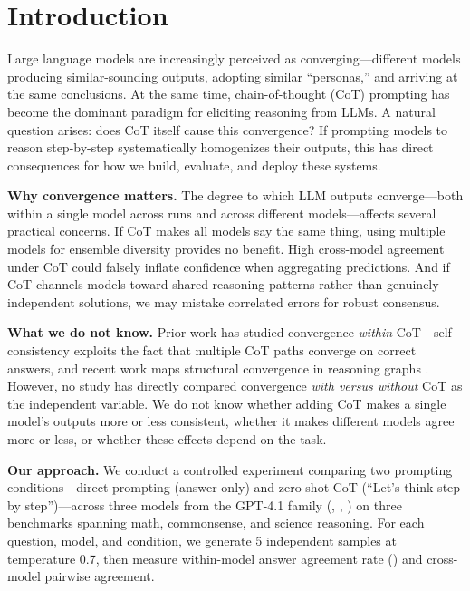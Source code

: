 \section{Introduction}
\label{sec:intro}

Large language models are increasingly perceived as converging---different models producing similar-sounding outputs, adopting similar ``personas,'' and arriving at the same conclusions. At the same time, chain-of-thought (CoT) prompting \citep{wei2022chain} has become the dominant paradigm for eliciting reasoning from LLMs. A natural question arises: does CoT itself cause this convergence? If prompting models to reason step-by-step systematically homogenizes their outputs, this has direct consequences for how we build, evaluate, and deploy these systems.

{\bf Why convergence matters.} The degree to which LLM outputs converge---both within a single model across runs and across different models---affects several practical concerns. If CoT makes all models say the same thing, using multiple models for ensemble diversity provides no benefit. High cross-model agreement under CoT could falsely inflate confidence when aggregating predictions. And if CoT channels models toward shared reasoning patterns rather than genuinely independent solutions, we may mistake correlated errors for robust consensus.

{\bf What we do not know.} Prior work has studied convergence \emph{within} CoT---self-consistency \citep{wang2022self} exploits the fact that multiple CoT paths converge on correct answers, and recent work maps structural convergence in reasoning graphs \citep{xiong2025mapping}. However, no study has directly compared convergence \emph{with versus without} CoT as the independent variable. We do not know whether adding CoT makes a single model's outputs more or less consistent, whether it makes different models agree more or less, or whether these effects depend on the task.

{\bf Our approach.} We conduct a controlled experiment comparing two prompting conditions---direct prompting (answer only) and zero-shot CoT (``Let's think step by step'')---across three models from the GPT-4.1 family (\gptlarge, \gptmini, \gptnano) on three benchmarks spanning math, commonsense, and science reasoning. For each question, model, and condition, we generate 5 independent samples at temperature 0.7, then measure within-model answer agreement rate (\aar) and cross-model pairwise agreement.

